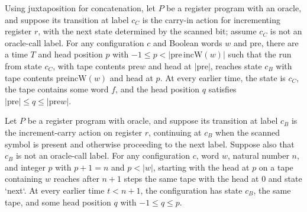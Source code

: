 \begin{lemma}
\label{Complexity.LogProg.incC_run}
\leanok
{}
Using juxtaposition for concatenation, let $P$ be a register program with an oracle, and suppose its transition at label $c_C$ is the carry-in action for incrementing register $r$, with the next state determined by the scanned bit; assume $c_C$ is not an oracle-call label. For any configuration $c$ and Boolean words $w$ and $\mathrm{pre}$, there are a time $T$ and head position $p$ with $-1\le p<|\mathrm{pre}\,\mathrm{incW}(w)|$ such that the run from state $c_C$, with tape contents $\mathrm{pre}w$ and head at $|\mathrm{pre}|$, reaches state $c_B$ with tape contents $\mathrm{pre}\mathrm{incW}(w)$ and head at $p$. At every earlier time, the state is $c_C$, the tape contains some word $f$, and the head position $q$ satisfies $|\mathrm{pre}|\le q\le|\mathrm{pre}w|$.
\end{lemma}

\begin{lemma}
\label{Complexity.LogProg.incB_run}
\leanok
{}
Let $P$ be a register program with oracle, and suppose its transition at label $c_B$ is
the increment-carry action on register $r$, continuing at $c_B$ when the scanned symbol
is present and otherwise proceeding to the next label. Suppose also that $c_B$ is not an
oracle-call label. For any configuration $c$, word $w$, natural number $n$, and integer
$p$ with $p+1=n$ and $p<|w|$, starting with the head at $p$ on a tape containing $w$
reaches after $n+1$ steps the same tape with the head at $0$ and state `next`. At every
earlier time $t<n+1$, the configuration has state $c_B$, the same tape, and some head
position $q$ with $-1\le q\le p$.
\end{lemma}

